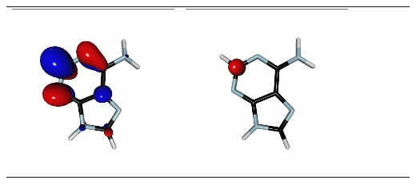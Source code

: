 \documentclass[journal=jctcce,manuscript=article]{achemso}
\begin{document}
\begin{table}[H]
\begin{tabular}{ l| c c c | c c c }
\begin{minipage}{0.2\textwidth}
        \includegraphics[scale=0.10]{NTO/Adenine_C/1p_C1.png}
    \end{minipage}
    & 
    \begin{minipage}{0.2\textwidth}
        \centering
        \includegraphics[scale=0.10]{NTO/Adenine_C/1h_Cs.png}

\end{minipage}
\end{tabular}
\end{table}
\end{document}
